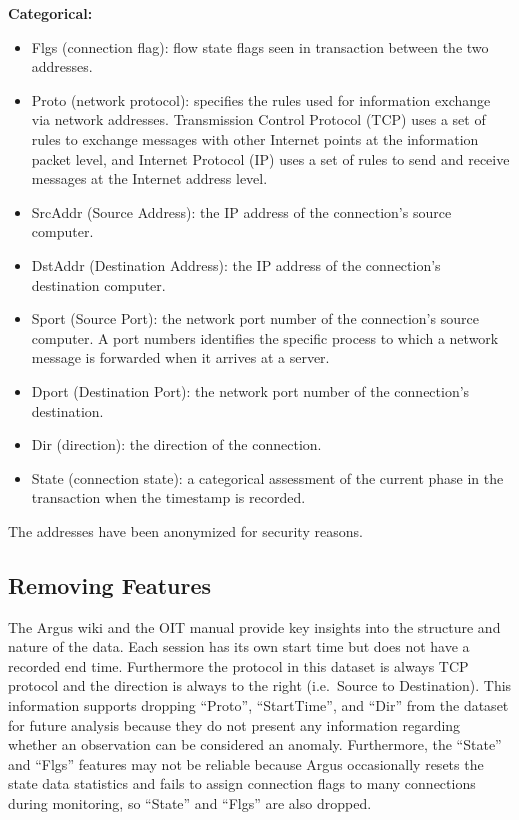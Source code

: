 \documentclass[12pt,twoside]{dukestatscithesis}
\providecommand{\tightlist}{%
  \setlength{\itemsep}{0pt}\setlength{\parskip}{0pt}}
\theoremstyle{definition}
\theoremstyle{definition}
\theoremstyle{definition}
\theoremstyle{remark}
\begin{document}
\textbf{Categorical:}
\begin{itemize}
\tightlist
\item
  Flgs (connection flag): flow state flags seen in transaction between
  the two addresses.
\item
  Proto (network protocol): specifies the rules used for information
  exchange via network addresses. Transmission Control Protocol (TCP)
  uses a set of rules to exchange messages with other Internet points at
  the information packet level, and Internet Protocol (IP) uses a set of
  rules to send and receive messages at the Internet address level.
\item
  SrcAddr (Source Address): the IP address of the connection's source
  computer.
\item
  DstAddr (Destination Address): the IP address of the connection's
  destination computer.
\item
  Sport (Source Port): the network port number of the connection's
  source computer. A port numbers identifies the specific process to
  which a network message is forwarded when it arrives at a server.
\item
  Dport (Destination Port): the network port number of the connection's
  destination.
\item
  Dir (direction): the direction of the connection.
\item
  State (connection state): a categorical assessment of the current
  phase in the transaction when the timestamp is recorded.
\end{itemize}
The addresses have been anonymized for security reasons.

\subsection{Removing Features}\label{removing-features}

The Argus wiki and the OIT manual provide key insights into the
structure and nature of the data. Each session has its own start time
but does not have a recorded end time. Furthermore the protocol in this
dataset is always TCP protocol and the direction is always to the right
(i.e.~Source to Destination). This information supports dropping
``Proto'', ``StartTime'', and ``Dir'' from the dataset for future
analysis because they do not present any information regarding whether
an observation can be considered an anomaly. Furthermore, the ``State''
and ``Flgs'' features may not be reliable because Argus occasionally
resets the state data statistics and fails to assign connection flags to
many connections during monitoring, so ``State'' and ``Flgs'' are also
dropped.
\end{document}
